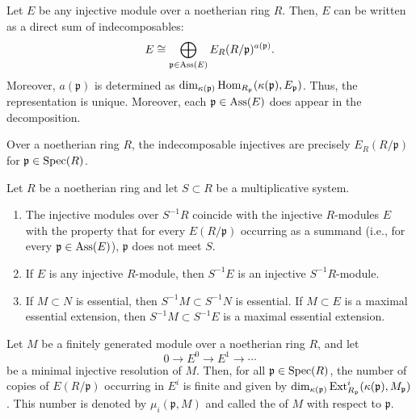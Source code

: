 \documentclass[12pt]{article}
\begin{document}
\begin{thm}
	Let $E$ be any injective module over a noetherian ring $R$. Then, $E$ can be written as a direct sum of indecomposables:
	\begin{equation*} 
		E \cong \bigoplus_{\mathfrak{p} \in \operatorname{Ass}(E)} E_{R}(R/\mathfrak{p})^{a(\mathfrak{p})}.
	\end{equation*}
	Moreover, $a(\mathfrak{p})$ is determined as $\dim_{\kappa(\mathfrak{p})} \operatorname{Hom}_{R_{\mathfrak{p}}}(\kappa(\mathfrak{p}), E_{\mathfrak{p}})$. Thus, the representation is unique. Moreover, each $\mathfrak{p} \in \operatorname{Ass}(E)$ does appear in the decomposition.
\end{thm}
\begin{cor}
	Over a noetherian ring $R$, the indecomposable injectives are precisely $E_{R}(R/\mathfrak{p})$ for $\mathfrak{p} \in \operatorname{Spec}(R)$.
\end{cor}

\begin{thm}
	Let $R$ be a noetherian ring and let $S \subset R$ be a multiplicative system.
	\begin{enumerate}[label=(\alph*)]
		\item The injective modules over $S^{-1} R$ coincide with the injective $R$-modules $E$ with the property that for every $E(R/\mathfrak{p})$ occurring as a summand (i.e., for every $\mathfrak{p} \in \operatorname{Ass}(E)$), $\mathfrak{p}$ does not meet $S$.
		\item If $E$ is any injective $R$-module, then $S^{-1} E$ is an injective $S^{-1} R$-module.
		\item If $M \subset N$ is essential, then $S^{-1} M \subset S^{-1} N$ is essential. If $M \subset E$ is a maximal essential extension, then $S^{-1} M \subset S^{-1} E$ is a maximal essential extension.
	\end{enumerate}
\end{thm}

\begin{thm}
	Let $M$ be a finitely generated module over a noetherian ring $R$, and let 
	\begin{equation*} 
		0 \to E^{0} \to E^{1} \to \cdots
	\end{equation*}
	be a minimal injective resolution of $M$. Then, for all $\mathfrak{p} \in \operatorname{Spec}(R)$, the number of copies of $E(R/\mathfrak{p})$ occurring in $E^{i}$ is finite and given by $\dim_{\kappa(\mathfrak{p})} \operatorname{Ext}^{i}_{R_{\mathfrak{p}}}(\kappa(\mathfrak{p}), M_{\mathfrak{p}})$. This number is denoted by $\mu_{i}(\mathfrak{p}, M)$ and called the  of $M$ with respect to $\mathfrak{p}$.
\end{thm}
\end{document}
